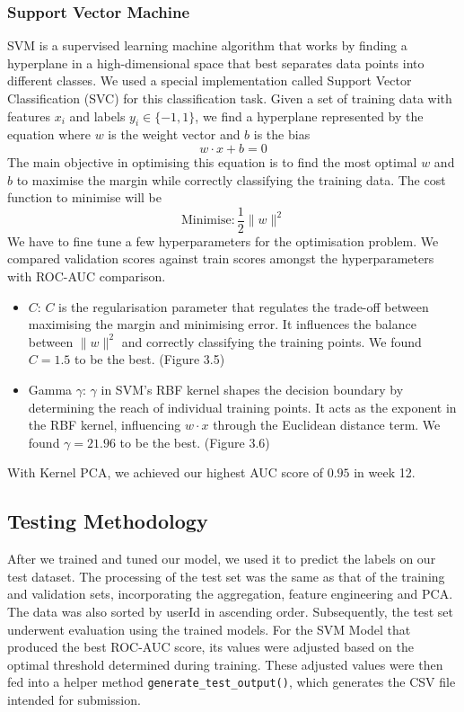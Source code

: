 \documentclass[12pt]{article}
\begin{document}
\subsubsection{Support Vector Machine}
SVM is a supervised learning machine algorithm that works by finding a hyperplane in a high-dimensional space that best separates data points into different classes. We used a special implementation called Support Vector Classification (SVC) for this classification task. Given a set of training data with features $x_i$ and labels $y_i \in \{-1, 1\}$, we find a hyperplane represented by the equation where $w$ is the weight vector and $b$ is the bias
$$
  w\cdot x + b = 0
$$
The main objective in optimising this equation is to find the most optimal $w$ and $b$ to maximise the margin while correctly classifying the training data. The cost function to minimise will be
$$
  \text{Minimise}: \frac{1}{2}\lVert w\rVert^2
$$
We have to fine tune a few hyperparameters for the optimisation problem. We compared validation scores against train scores amongst the hyperparameters with ROC-AUC comparison.

\begin{itemize}
  \item $C$: $C$ is the regularisation parameter that regulates the trade-off between maximising the margin and minimising error. It influences the balance between $\lVert w\rVert^2$ and correctly classifying the training points. We found $C=1.5$ to be the best. (Figure 3.5)
  \item Gamma $\gamma$: $\gamma$ in SVM's RBF kernel shapes the decision boundary by determining the reach of individual training points. It acts as the exponent in the RBF kernel, influencing $w\cdot x$ through the Euclidean distance term. We found $\gamma = 21.96$ to be the best. (Figure 3.6)
\end{itemize}
With Kernel PCA, we achieved our highest AUC score of $0.95$ in week 12.

\subsection{Testing Methodology}
After we trained and tuned our model, we used it to predict the labels on our test dataset. The processing of the test set was the same as that of the training and validation sets, incorporating the aggregation, feature engineering and PCA. The data was also sorted by userId in ascending order. Subsequently, the test set underwent evaluation using the trained models. For the SVM Model that produced the best ROC-AUC score, its values were adjusted based on the optimal threshold determined during training. These adjusted values were then fed into a helper method \lstinline{generate_test_output()}, which generates the CSV file intended for submission.
\end{document}
